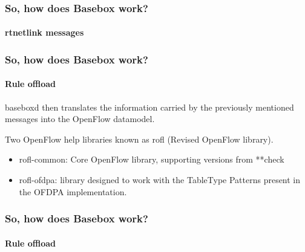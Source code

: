 \documentclass[11pt]{beamer}
\begin{document}
\label{messages}
\begin{frame}
\frametitle{So, how does Basebox work?}
\framesubtitle{rtnetlink messages}

{%
\small
{}}

\end{frame}



\begin{frame}
\frametitle{So, how does Basebox work?}
\framesubtitle{Rule offload}

baseboxd then translates the information carried by the previously mentioned messages into the OpenFlow datamodel. 

Two OpenFlow help libraries known as rofl (Revised OpenFlow library).

\begin{itemize}
\item rofl-common: Core OpenFlow library, supporting versions from **check
\item rofl-ofdpa: library designed to work with the TableType Patterns present in the OFDPA implementation.
\end{itemize}
\end{frame}

\begin{frame}
\frametitle{So, how does Basebox work?}
\framesubtitle{Rule offload}


\end{frame}
\end{document}
